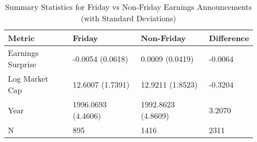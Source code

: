 \begin{table}
\caption{Summary Statistics for Friday vs Non-Friday Earnings Announcements (with Standard Deviations)}
\label{tab:summary_statistics_with_std_combined}
\begin{tabular}{llll}
\toprule
Metric & Friday & Non-Friday & Difference \\
\midrule
Earnings Surprise & -0.0054
(0.0618) & 0.0009
(0.0419) & -0.0064 \\
Log Market Cap & 12.6007
(1.7391) & 12.9211
(1.8523) & -0.3204 \\
Year & 1996.0693
(4.4606) & 1992.8623
(4.8609) & 3.2070 \\
N & 895 & 1416 & 2311 \\
\bottomrule
\end{tabular}
\end{table}
